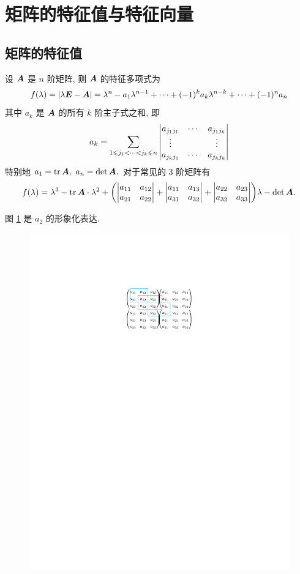 \section{矩阵的特征值与特征向量}

\subsection{矩阵的特征值}

\begin{theorem}[特征多项式展开定理]
    设 $\vb*{A}$ 是 $n$ 阶矩阵, 则 $\vb*{A}$ 的特征多项式为 
    $$f(\lambda)=|\lambda\vb*{E}-\vb*{A}|=\lambda^n-a_1\lambda^{n-1}+\cdots+(-1)^ka_k\lambda^{n-k}+\cdots+(-1)^na_n$$
    其中 $a_k$ 是 $\vb*{A}$ 的所有 $k$ 阶主子式之和, 即 
    $$a_k=\sum_{1\leqslant j_1<\cdots<j_k\leqslant n}\mqty|a_{j_1j_1}&\cdots&a_{j_1j_k}\\\vdots&&\vdots\\a_{j_kj_1}&\cdots&a_{j_kj_k}|$$
    特别地 $a_1=\tr\vb*{A},~a_n=\det\vb*{A}.$
    对于常见的 3 阶矩阵有 $$f(\lambda)=\lambda^3-\tr\vb*{A}\cdot\lambda^2+\qty(\mqty|a_{11}&a_{12}\\a_{21}&a_{22}|+\mqty|a_{11}&a_{13}\\a_{31}&a_{32}|+\mqty|a_{22}&a_{23}\\a_{32}&a_{33}|)\lambda-\det\vb*{A}.$$
\end{theorem}

图 \ref{fig:kjiezzshi} 是 $a_2$ 的形象化表达.
\begin{figure}[H]
    \centering
    \includegraphics[scale=1]{figures/kjiezzshi.pdf}
    \caption{}
    \label{fig:kjiezzshi}
\end{figure}

